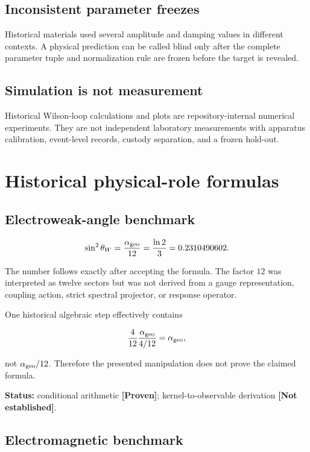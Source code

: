\documentclass[11pt,a4paper,openany]{report}
\newcommand{\statusProven}{\textcolor{fingreen}{[Proven]}}
\begin{document}
\subsection{Inconsistent parameter freezes}

Historical materials used several amplitude and damping values in different contexts. A physical prediction can be called blind only after the complete parameter tuple and normalization rule are frozen before the target is revealed.

\subsection{Simulation is not measurement}

Historical Wilson-loop calculations and plots are repository-internal numerical experiments. They are not independent laboratory measurements with apparatus calibration, event-level records, custody separation, and a frozen hold-out.

\section{Historical physical-role formulas}

\subsection{Electroweak-angle benchmark}

\[
\sin^2\theta_W
=
\frac{\alpha_{\rm geo}}{12}
=
\frac{\ln2}{3}
=
0.2310490602.
\]

The number follows exactly after accepting the formula. The factor \(12\) was interpreted as twelve sectors but was not derived from a gauge representation, coupling action, strict spectral projector, or response operator.

One historical algebraic step effectively contains

\[
\frac{4}{12}
\frac{\alpha_{\rm geo}}{4/12}
=
\alpha_{\rm geo},
\]

not \(\alpha_{\rm geo}/12\). Therefore the presented manipulation does not prove the claimed formula.

\textbf{Status:} conditional arithmetic \textbf{\statusProven{}}; kernel-to-observable derivation \textbf{[Not established]}.

\subsection{Electromagnetic benchmark}
\end{document}
